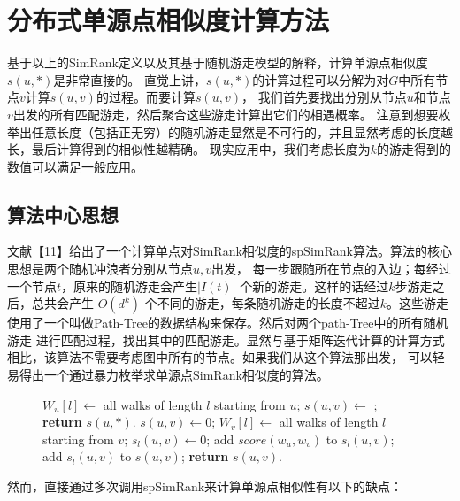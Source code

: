 \documentclass[master]{njuthesis}
\begin{document}
\chapter{分布式单源点相似度计算方法}\label{chapter_sssSimRank}

基于以上的SimRank定义以及其基于随机游走模型的解释，计算单源点相似度 $s(u,*)$是非常直接的。
直觉上讲，$s(u,*)$的计算过程可以分解为对$G$中所有节点$v$计算$s(u,v)$的过程。而要计算$s(u,v)$，
我们首先要找出分别从节点$u$和节点$v$出发的所有匹配游走，然后聚合这些游走计算出它们的相遇概率。
注意到想要枚举出任意长度（包括正无穷）的随机游走显然是不可行的，并且显然考虑的长度越长，最后计算得到的相似性越精确。
现实应用中，我们考虑长度为$k$的游走得到的数值可以满足一般应用。
\section{算法中心思想}
文献【11】给出了一个计算单点对SimRank相似度的spSimRank算法。算法的核心思想是两个随机冲浪者分别从节点$u,v$出发，
每一步跟随所在节点的入边；每经过一个节点$t$，原来的随机游走会产生$|I(t)|$ 个新的游走。这样的话经过$k$步游走之后，总共会产生
$O(d^k)$ 个不同的游走，每条随机游走的长度不超过$k$。这些游走使用了一个叫做Path-Tree的数据结构来保存。然后对两个path-Tree中的所有随机游走
进行匹配过程，找出其中的匹配游走。显然与基于矩阵迭代计算的计算方式相比，该算法不需要考虑图中所有的节点。如果我们从这个算法那出发，
可以轻易得出一个通过暴力枚举求单源点SimRank相似度的算法。

\begin{figure}
\begin{algorithm}[H]
\label{alg:one}
\begin{algorithmic}[1]
		\State $W_u[l] \gets $ all walks of length $l$ starting from $u$;
	\EndFor
		\State $s(u,v)\gets$  ;
	\EndFor
	\State \textbf{return} $s(u, *)$.
\EndProcedure
{}
\State $s(u, v) \gets 0$;
	\State $W_v[l] \gets $ all walks of length $l$ starting from $v$;
	\State $s_l(u, v) \gets 0$;
			\State add  $score(w_u, w_v)$ to  $s_l(u, v)$;
		\EndIf
		\EndFor
	\EndFor
	\State add $s_l(u, v)$ to $s(u, v)$;
\EndFor
\State \textbf{return} $s(u, v)$.
\EndProcedure
\end{algorithmic}
\end{algorithm}
\end{figure}
然而，直接通过多次调用spSimRank来计算单源点相似性有以下的缺点：
\end{document}
